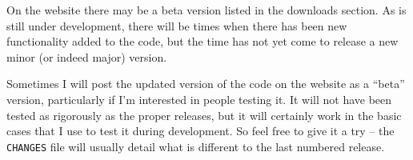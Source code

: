 
On the \duchamp website there may be a beta version listed in the
downloads section. As \duchamp is still under development, there will
be times when there has been new functionality added to the code, but
the time has not yet come to release a new minor (or indeed major)
version. 

Sometimes I will post the updated version of the code on the website
as a ``beta'' version, particularly if I'm interested in people
testing it. It will not have been tested as rigorously as the proper
releases, but it will certainly work in the basic cases that I use to
test it during development. So feel free to give it a try -- the
\texttt{CHANGES} file will usually detail what is different to the last
numbered release.
